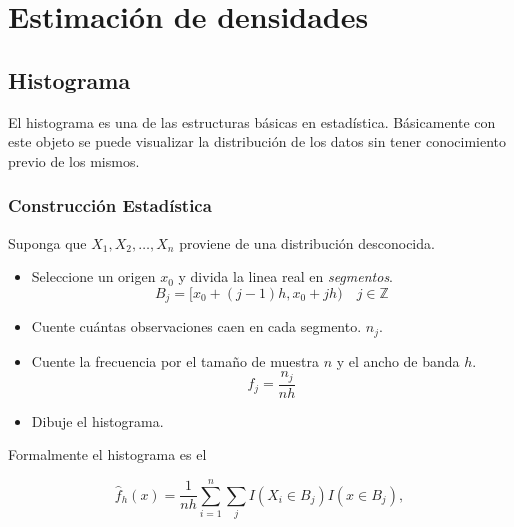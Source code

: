 \documentclass[12pt]{book}\usepackage[]{graphicx}\usepackage[]{color}
\theoremstyle{definition}
\theoremstyle{plain}
\begin{document}


\chapter{Estimación de densidades}

\section{Histograma}

El histograma es una de las estructuras básicas en estadística. Básicamente con este objeto se puede visualizar la distribución de los datos sin tener conocimiento previo de los mismos.

\subsection{Construcción Estadística}

Suponga que  \(X_1,X_2, \dots ,X_n\) proviene de una distribución desconocida.

\begin{itemize}
	\item Seleccione un origen \(x_0\) y divida la linea real en \emph{segmentos}.
	      \begin{equation*}
		      B_j = [x_0 +(j - 1)h,x_0 + jh) \quad j\in \mathbb{Z}
	      \end{equation*}

	\item Cuente cuántas observaciones caen en cada segmento. \(n_j\).


	\item Cuente la frecuencia por el tamaño de muestra \(n\) y el ancho de banda \(h\).
	      \begin{equation*}
		      f_j = \frac{n_j}{nh}
	      \end{equation*}

	\item  Dibuje el histograma.



\end{itemize}

Formalmente el histograma es el

\begin{equation*}
	\hat{f}_h(x) = \frac{1}{nh} \sum_{i = 1}^{n} \sum_{j} I(X_i\in B_j) I(x\in B_j),
\end{equation*}
\end{document}
